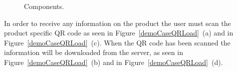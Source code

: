 	\begin{figure}[ht!]
		\centering
		\qquad
		\qquad
		\qquad
		\qquad
		\caption{Components.}
		\label{demoCaseRaw}
	\end{figure}

In order to receive any information on the product the user must scan the product specific QR code as seen in Figure~\ref{demoCaseQRLoad}~(a) and in Figure~\ref{demoCaseQRLoad}~(c). When the QR code has been scanned the information will be downloaded from the server, as seen in Figure~\ref{demoCaseQRLoad}~(b) and in Figure~\ref{demoCaseQRLoad}~(d).

